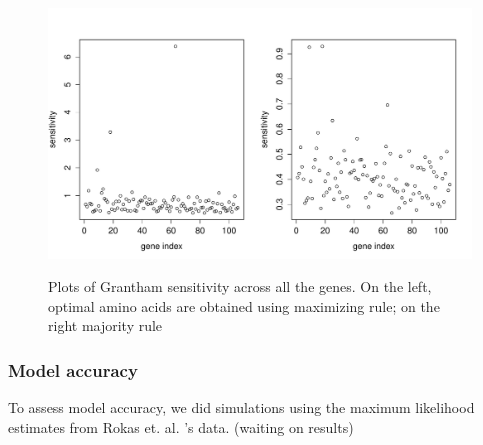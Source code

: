 \documentclass[13pt]{article}
\begin{document}
\begin{figure}[ht]
\caption{Plots of Grantham sensitivity across all the genes. On the left, optimal amino acids are obtained using maximizing rule; on the right majority rule}
\centering
\includegraphics[width=\textwidth]{gvalue.pdf}
\label{fig:gvalue}
\end{figure}


\subsubsection{Model accuracy}
To assess model accuracy, we did simulations using the maximum likelihood estimates from Rokas et. al. 's data. (waiting on results)
\end{document}
